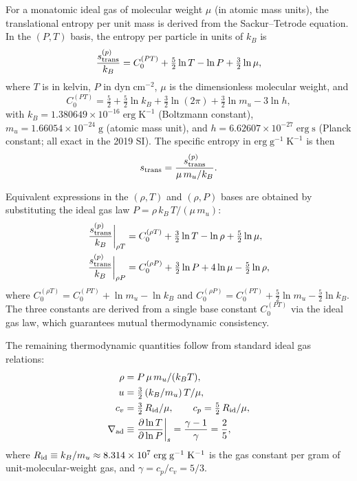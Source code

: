 \documentclass[twocolumn]{aastex701}
\begin{document}
For a monatomic ideal gas of molecular weight $\mu$ (in atomic mass units), the translational entropy per unit mass is derived from the Sackur--Tetrode equation.  In the $(P,T)$ basis, the entropy per particle in units of $k_B$ is
\begin{equation}\label{eq:sackur_tetrode}
    \frac{s_{\rm trans}^{(p)}}{k_B} = C_0^{(PT)} + \tfrac{5}{2}\ln T - \ln P + \tfrac{3}{2}\ln\mu,
\end{equation}
where $T$ is in kelvin, $P$ in $\mathrm{dyn\;cm^{-2}}$, $\mu$ is the dimensionless molecular weight, and
\begin{equation}\label{eq:c0pt}
    C_0^{(PT)} = \tfrac{5}{2} + \tfrac{5}{2}\ln k_B + \tfrac{3}{2}\ln(2\pi) + \tfrac{3}{2}\ln m_u - 3\ln h,
\end{equation}
with $k_B = 1.380649\times10^{-16}\;\mathrm{erg\;K^{-1}}$ (Boltzmann constant), $m_u = 1.66054\times10^{-24}\;\mathrm{g}$ (atomic mass unit), and $h = 6.62607\times10^{-27}\;\mathrm{erg\;s}$ (Planck constant; all exact in the 2019 SI).
The specific entropy in $\mathrm{erg\;g^{-1}\;K^{-1}}$ is then
\begin{equation}
    s_{\rm trans} = \frac{s_{\rm trans}^{(p)}}{\mu\, m_u / k_B}.
\end{equation}

Equivalent expressions in the $(\rho,T)$ and $(\rho,P)$ bases are obtained by substituting the ideal gas law $P = \rho\, k_B\, T / (\mu\, m_u)$:
\begin{align}
    \frac{s_{\rm trans}^{(p)}}{k_B}\bigg|_{\rho T} &= C_0^{(\rho T)} + \tfrac{3}{2}\ln T - \ln\rho + \tfrac{5}{2}\ln\mu, \label{eq:s_rhot} \\
    \frac{s_{\rm trans}^{(p)}}{k_B}\bigg|_{\rho P} &= C_0^{(\rho P)} + \tfrac{3}{2}\ln P + 4\ln\mu - \tfrac{5}{2}\ln\rho, \label{eq:s_rhop}
\end{align}
where $C_0^{(\rho T)} = C_0^{(PT)} + \ln m_u - \ln k_B$ and $C_0^{(\rho P)} = C_0^{(PT)} + \tfrac{5}{2}\ln m_u - \tfrac{5}{2}\ln k_B$.
The three constants are derived from a single base constant $C_0^{(PT)}$ via the ideal gas law, which guarantees mutual thermodynamic consistency.

The remaining thermodynamic quantities follow from standard ideal gas relations:
\begin{align}
    \rho &= P\,\mu\,m_u / (k_B T), \\
    u &= \tfrac{3}{2}\,(k_B / m_u)\, T / \mu, \\
    c_v &= \tfrac{3}{2}\, R_{\rm id} / \mu, \qquad c_p = \tfrac{5}{2}\, R_{\rm id} / \mu, \\
    \nabla_{\rm ad} &\equiv \frac{\partial \ln T}{\partial \ln P}\bigg|_s = \frac{\gamma-1}{\gamma} = \frac{2}{5},
\end{align}
where $R_{\rm id} \equiv k_B / m_u \approx 8.314\times10^{7}\;\mathrm{erg\;g^{-1}\;K^{-1}}$ is the gas constant per gram of unit-molecular-weight gas, and $\gamma = c_p/c_v = 5/3$.
\end{document}
